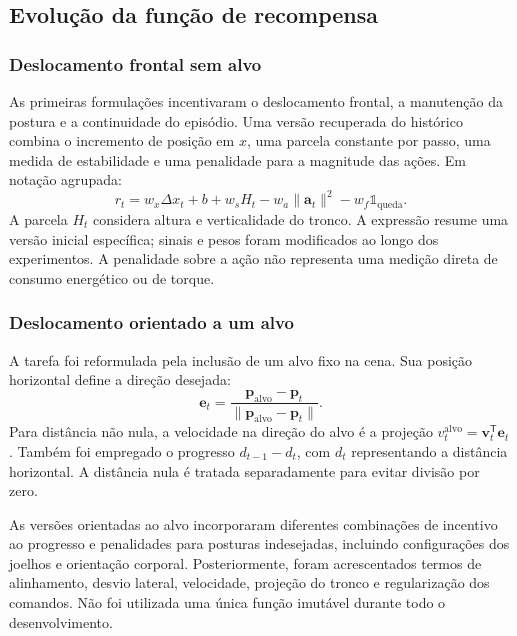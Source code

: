 \subsection{Evolução da função de recompensa}

\subsubsection*{Deslocamento frontal sem alvo}

As primeiras formulações incentivaram o deslocamento frontal, a manutenção da postura e a continuidade do episódio. Uma versão recuperada do histórico combina o incremento de posição em $x$, uma parcela constante por passo, uma medida de estabilidade e uma penalidade para a magnitude das ações. Em notação agrupada:
\begin{equation}
r_t=w_x\Delta x_t+b+w_sH_t-w_a\|\mathbf{a}_t\|^2
-w_f\mathbb{1}_{\mathrm{queda}}.
\end{equation}
A parcela $H_t$ considera altura e verticalidade do tronco. A expressão resume uma versão inicial específica; sinais e pesos foram modificados ao longo dos experimentos. A penalidade sobre a ação não representa uma medição direta de consumo energético ou de torque.

\subsubsection*{Deslocamento orientado a um alvo}

A tarefa foi reformulada pela inclusão de um alvo fixo na cena. Sua posição horizontal define a direção desejada:
\begin{equation}
\mathbf{e}_t=\frac{\mathbf{p}_{\mathrm{alvo}}-\mathbf{p}_t}
{\|\mathbf{p}_{\mathrm{alvo}}-\mathbf{p}_t\|}.
\end{equation}
Para distância não nula, a velocidade na direção do alvo é a projeção $v^{\mathrm{alvo}}_t=\mathbf{v}_t^{\mathsf T}\mathbf{e}_t$. Também foi empregado o progresso $d_{t-1}-d_t$, com $d_t$ representando a distância horizontal. A distância nula é tratada separadamente para evitar divisão por zero.

As versões orientadas ao alvo incorporaram diferentes combinações de incentivo ao progresso e penalidades para posturas indesejadas, incluindo configurações dos joelhos e orientação corporal. Posteriormente, foram acrescentados termos de alinhamento, desvio lateral, velocidade, projeção do tronco e regularização dos comandos. Não foi utilizada uma única função imutável durante todo o desenvolvimento.

